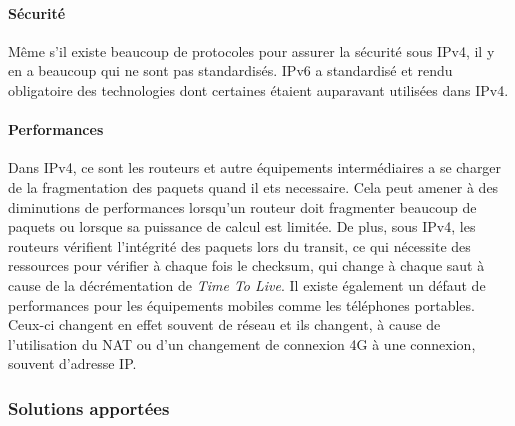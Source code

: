 \paragraph{Sécurité}
Même s'il existe beaucoup de protocoles pour assurer la sécurité sous IPv4, il
y en a beaucoup qui ne sont pas standardisés. IPv6 a standardisé et rendu
obligatoire des technologies dont certaines étaient auparavant utilisées dans
IPv4. 

\paragraph{Performances}
Dans IPv4, ce sont les routeurs et autre équipements
intermédiaires a se charger de la fragmentation des paquets quand il ets
necessaire. Cela peut amener à des diminutions de performances lorsqu'un
routeur doit fragmenter beaucoup de paquets ou lorsque sa puissance de calcul
est limitée. De plus, sous IPv4, les routeurs vérifient l'intégrité des paquets lors du
transit, ce qui nécessite des ressources pour vérifier à chaque fois le
checksum, qui change à chaque saut à cause de la décrémentation de {\it Time To
Live}.
\smallbreak
Il existe également un défaut de performances pour les équipements mobiles
comme les téléphones portables. Ceux-ci changent en effet souvent de réseau et
ils changent, à cause de l'utilisation du NAT ou d'un changement de connexion
4G à une connexion, souvent d'adresse IP. 


\subsubsection{Solutions apportées}


